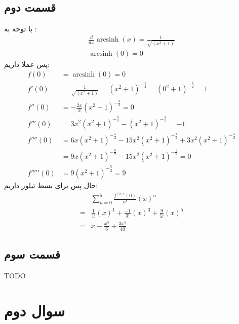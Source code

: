 \documentclass[]{article}
\begin{document}
\subsection*{قسمت دوم}
با توجه به :
\begin{gather*}
    \frac{d}{dx}\operatorname{arcsinh}(x) = \frac{1}{\sqrt{(x^2+1)}}\\
    \operatorname{arcsinh}(0) = 0
\end{gather*}
پس عملا داریم:
\begin{align*}
    f(0) &= \operatorname{arcsinh}(0) = 0\\
    f'(0) &= \frac{1}{\sqrt{(x^2+1)}} = (x^2+1)^{-\frac{1}{2}} = (0^2+1)^{-\frac{1}{2}} = 1\\
    f''(0) &= -\frac{2x}{2} (x^2+1)^{-\frac{3}{2}} = 0\\
    f'''(0) &= 3x^2 (x^2+1)^{-\frac{5}{2}} - (x^2+1)^{-\frac{3}{2}} = -1\\
    f''''(0) &= 6x (x^2+1)^{-\frac{5}{2}} - 15x^2 (x^2+1)^{-\frac{7}{2}} + 3x^2 (x^2+1)^{-\frac{5}{2}} \\
    &= 9x (x^2+1)^{-\frac{5}{2}} - 15x^2 (x^2+1)^{-\frac{7}{2}} = 0\\
    f'''''(0) &= 9 (x^2+1)^{-\frac{5}{2}} = 9
\end{align*}
حال پس برای بسط تیلور داریم:
\begin{align*}
    &\sum_{n=0}^{5} \frac{f^{(n)}(0)}{n!}(x)^n\\
    =&\frac{1}{1!}(x)^1 + \frac{-1}{3!}(x)^3 + \frac{9}{5!}(x)^5\\
    =&\boxed{x - \frac{x^3}{6} + \frac{3x^5}{40}}
\end{align*}
\subsection*{قسمت سوم}
TODO
\section*{سوال دوم}
\end{document}
